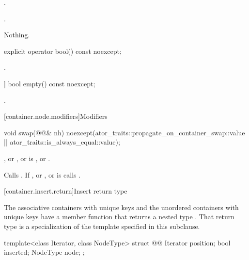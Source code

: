 \begin{itemdescr}
\pnum
\expects
{}.

\pnum
\returns
{}.

\pnum
\throws
Nothing.
\end{itemdescr}

\begin{itemdecl}
explicit operator bool() const noexcept;
\end{itemdecl}

\begin{itemdescr}
\pnum
\returns
{}.
\end{itemdescr}

\begin{itemdecl}
[[nodiscard]] bool empty() const noexcept;
\end{itemdecl}

\begin{itemdescr}
\pnum
\returns
{}.
\end{itemdescr}

[container.node.modifiers]{Modifiers}

\begin{itemdecl}
void swap(@@& nh)
  noexcept(ator_traits::propagate_on_container_swap::value ||
           ator_traits::is_always_equal::value);
\end{itemdecl}

\begin{itemdescr}
\pnum
\expects
{}, or , or
 is ,
or .

\pnum
\effects
Calls . If , or
, or 
is  calls .
\end{itemdescr}

[container.insert.return]{Insert return type}

\pnum
The associative containers with unique keys and the unordered containers with unique keys
have a member function  that returns a nested type .
That return type is a specialization of the template specified in this subclause.

\begin{codeblock}
template<class Iterator, class NodeType>
struct @@
{
  Iterator position;
  bool     inserted;
  NodeType node;
};
\end{codeblock}

